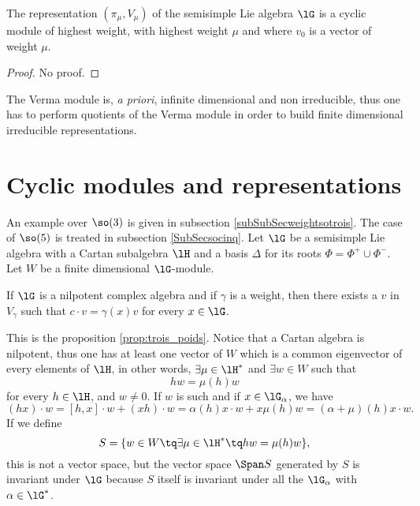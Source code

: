 \begin{theorem}
The representation $(\pi_{\mu},V_{\mu})$ of the semisimple Lie algebra $\lG$ is a cyclic module of highest weight, with highest weight $\mu$ and where $v_0$ is a vector of weight $\mu$.
\end{theorem}
\begin{proof}
    No proof.
\end{proof}
The Verma module is, \emph{a priori}, infinite dimensional and non irreducible, thus one has to perform quotients of the Verma module in order to build finite dimensional irreducible representations.
                    \section{Cyclic modules and representations}

An example over $\so(3)$ is given in subsection \ref{subSubSecweightsotrois}. The case of $\so(5)$ is treated in subsection \ref{SubSecsocinq}. Let $\lG$ be a semisimple Lie algebra with a Cartan subalgebra $\lH$ and a basis $\Delta$ for its roots $\Phi=\Phi^+\cup\Phi^-$. Let $W$ be a finite dimensional $\lG$-module.

\begin{lemma}
If $\lG$ is a nilpotent complex algebra and if $\gamma$ is a weight, then there exists a $v$ in $V_{\gamma}$ such that $c\cdot v=\gamma(x)v$ for every $x\in\lG$.
\end{lemma}
This is the proposition \ref{prop:trois_poids}. Notice that a Cartan algebra is nilpotent, thus one has at least one vector of $W$ which is a common eigenvector of every elements of $\lH$, in other words, $\exists\mu\in\lH^*$ and $\exists w\in W$ such that
\begin{equation}
    hw=\mu(h)w
\end{equation}
for every $h\in\lH$, and $w\neq 0$. If $w$ is such and if $x\in\lG_{\alpha}$, we have
\begin{equation}
    (hx)\cdot w=[h,x]\cdot w+(xh)\cdot w=\alpha(h)x\cdot w+x\mu(h)w=(\alpha+\mu)(h)x\cdot w.
\end{equation}
If we define 
\begin{equation}
    S=\{ w\in W\tq\exists\mu\in\lH^*\tq hw=\mu(h)w \},
\end{equation}
this is not a vector space, but the vector space $\Span S$ generated by $S$ is invariant under $\lG$ because $S$ itself is invariant under all the $\lG_{\alpha}$ with $\alpha\in\lG^*$.

